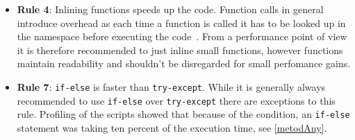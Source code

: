 \documentclass[12pt, a4paper]{article}
\begin{document}
\begin{itemize}
    Even though explicit use of functions are fast, there seems to be a greater overhead for just one function call if a function is imported explicitly compared to importing a whole module.
    The speed difference between explicit imports of functions and a whole module when executing a function once, can easily be made with the timeit module.
    Just to illustrate the speed difference for a single function call, a fast test was done with \texttt{python3 -m timeit -v 'from numpy import array; a = array([0])'} (\SI{1.4}{\micro\second} per loop for 200 000 loops) and \texttt{python3 -m timeit -v 'import numpy; a = numpy.array([0])'} (\SI{986}{\nano\second} per loop for 200 000 loops).

    \item \textbf{Rule 4}: Inlining functions speeds up the code.
    Function calls in general introduce overhead as each time a function is called it has to be looked up in the namespace before executing the code~\cite{oreillyCh4}.
    From a performance point of view it is therefore recommended to just inline small functions, however functions maintain readability and shouldn't be disregarded for small perfomance gains. 



    \item \textbf{Rule 7}: \texttt{if-else} is faster than \texttt{try-except}.
    While it is generally always recommended to use \texttt{if-else} over \texttt{try-except} there are exceptions to this rule.
    Profiling of the scripts showed that because of the condition, an \texttt{if-else} statement was taking ten percent of the execution time, see \cref{metodAny}.


\end{itemize}
\end{document}
